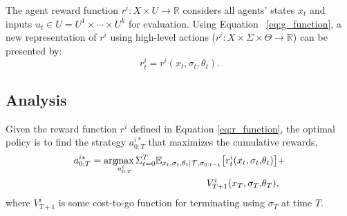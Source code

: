 \documentclass[letterpaper, 10 pt, conference]{ieeeconf}  %
\newcommand{\argmax}{\arg\!\!\max}
\begin{document}
The agent reward function $r^i: X \times U \rightarrow \mathbb{R}$ considers 
all agents' states $x_t$ and inputs $u_t \in U = U^1\times \cdots \times U^k$ 
for evaluation. Using Equation ~\ref{eq:g_function}, a new representation of 
$r^i$ using high-level actions ($r^i:X\times \Sigma \times \Theta \rightarrow \mathbb{R}$) can 
be presented by:
\begin{equation}\label{eq:r_function}
r^i_t = r^i(x_t,\sigma_t,\theta_t).
\end{equation}



\subsection{Analysis}
Given the reward function $r^i$ defined in Equation \ref{eq:r_function}, the optimal 
policy is to find the strategy $a^{i*}_{0:T}$ that maximizes the cumulative rewards,
\begin{equation}\label{eq:optimal}
\begin{aligned}
  a^{i*}_{0:T} = \argmax_{a^i_{0:T}} 
  \Sigma_{t=0}^{T} 
  \mathbb{E}_{x_t,\sigma_{t},\theta_t|\mathcal{T},\sigma_{0:t-1}} \big{[}
  r^i_t(x_t,\sigma_t,&\theta_t)\big{]}+ \\ 
  V^i_{T+1}(x_T,\sigma_T,&\theta_T), 
\end{aligned}
\end{equation}
where $V^i_{T+1}$ is some cost-to-go function for terminating using $\sigma_T$ at 
time $T$.
\end{document}
